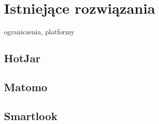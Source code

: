 \section{Istniejące rozwiązania}
ograniczenia, platformy

\subsection{HotJar}

\subsection{Matomo}

\subsection{Smartlook}
